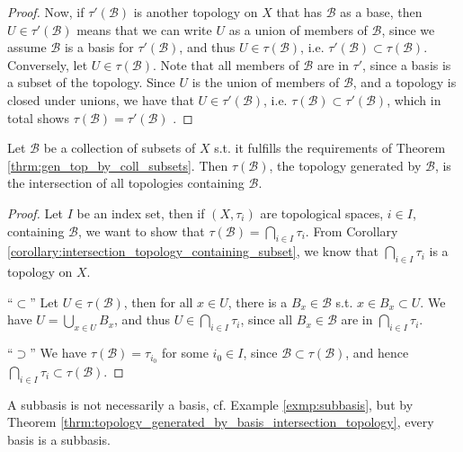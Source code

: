 \begin{proof}
	Now, if $\tau'(\mathscr B)$ is another topology on $X$ that has $\mathscr B$ as a base, then $U\in\tau'(\mathscr B)$ means that we can write $U$ as a union of members of $\mathscr B$, since we assume $\mathscr B$ is a basis for $\tau'(\mathscr B)$, and thus $U\in \tau(\mathscr B)$, i.e. $\tau'(\mathscr B)\subset \tau(\mathscr B)$. Conversely, let $U\in\tau(\mathscr B)$. Note that all members of $\mathscr B$ are in $\tau'$, since a basis is a subset of the topology. Since $U$ is the union of members of $\mathscr B$, and a topology is closed under unions, we have that $U\in\tau'(\mathscr B)$, i.e. $\tau(\mathscr B)\subset\tau'(\mathscr B)$, which in total shows $\tau(\mathscr B) = \tau'(\mathscr B)$ \cite{713096}.
\end{proof}

\begin{theorem}\label{thrm:topology_generated_by_basis_intersection_topology}
	Let $\mathscr B$ be a collection of subsets of $X$ s.t. it fulfills the requirements of Theorem \ref{thrm:gen_top_by_coll_subsets}. Then $\tau(\mathscr B)$, the topology generated by $\mathscr B$, is the intersection of all topologies containing $\mathscr B$.
\end{theorem}

\begin{proof}
	Let $I$ be an index set, then if $(X, \tau_i)$ are topological spaces, $i\in I$, containing $\mathscr B$, we want to show that $\tau(\mathscr B) = \bigcap_{i\in I}\tau_i$. From Corollary \ref{corollary:intersection_topology_containing_subset}, we know that $\bigcap_{i\in I}\tau_i$ is a topology on $X$.
	
	\enquote{$\subset$} Let $U\in\tau(\mathscr B)$, then for all $x\in U$, there is a $B_x\in\mathscr B$ s.t. $x\in B_x\subset U$. We have $U = \bigcup_{x\in U}B_x$, and thus $U\in \bigcap_{i\in I}\tau_i$, since all $B_x\in \mathscr B$ are in $\bigcap_{i\in I}\tau_i$. 
	
	\enquote{$\supset$} We have $\tau(\mathscr B) = \tau_{i_0}$ for some $i_0\in I$, since $\mathscr B\subset \tau(\mathscr B)$, and hence $\bigcap_{i\in I}\tau_i\subset \tau(\mathscr B)$.
\end{proof}

\begin{remark}
	A subbasis is not necessarily a basis, cf. Example \ref{exmp:subbasis}, but by Theorem  \ref{thrm:topology_generated_by_basis_intersection_topology}, every basis is a subbasis.
\end{remark}

